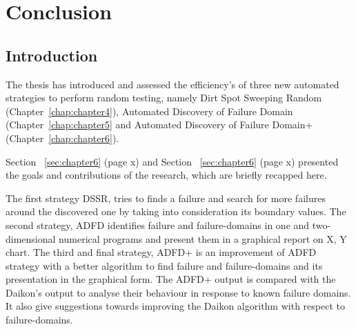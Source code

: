 \chapter{Conclusion}
\label{chap:conclusion}

\section{Introduction}\label{sec:intro7}



The thesis has introduced and assessed the efficiency's of three new automated strategies to perform random testing, namely Dirt Spot Sweeping Random (Chapter~\ref{chap:chapter4}), Automated Discovery of Failure Domain (Chapter~\ref{chap:chapter5} and Automated Discovery of Failure Domain+ (Chapter~\ref{chap:chapter6}). 

Section ~\ref{sec:chapter6} (page x) and Section ~\ref{sec:chapter6} (page x) presented the goals and contributions of the research, which are briefly recapped here.

The first strategy DSSR, tries to finds a failure and search for more failures around the discovered one by taking into consideration its boundary values. The second strategy, ADFD identifies failure and failure-domains in one and two-dimensional numerical programs and present them in a graphical report on X, Y chart. The third and final strategy, ADFD+ is an improvement of ADFD strategy with a better algorithm to find failure and failure-domains and its presentation in the graphical form. The ADFD+ output is compared with the Daikon's output to analyse their behaviour in response to known failure domains. It also give suggestions towards improving the Daikon algorithm with respect to failure-domains.




